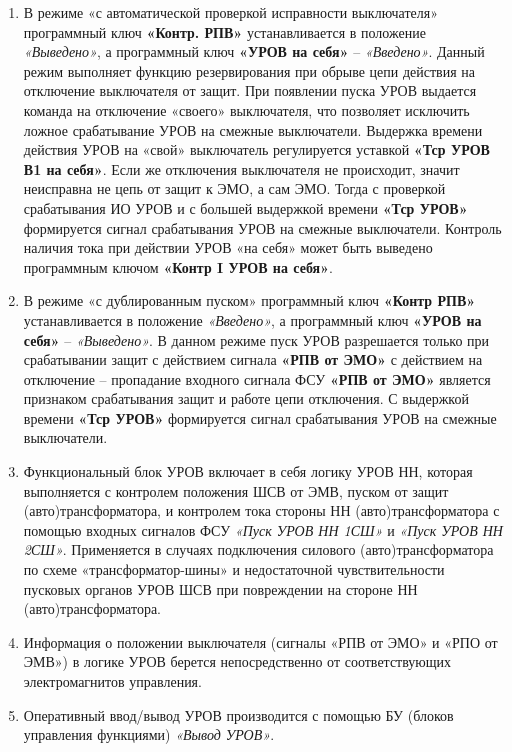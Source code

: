 \begin{enumerate}[label=\arabic{section}.\arabic{subsection}.\arabic*,  align=left, labelsep=4pt, leftmargin=0pt, itemindent=57pt]
\item
В режиме «с автоматической проверкой исправности выключателя» программный ключ
\textbf{«Контр. РПВ»} устанавливается в положение \textit{«Выведено»}, а программный ключ \textbf{«УРОВ на себя»} -- \textit{«Введено»}.
Данный режим выполняет функцию резервирования при обрыве цепи действия на отключение выключателя
от защит. При появлении пуска УРОВ выдается команда на отключение «своего» выключателя, что позволяет
исключить ложное срабатывание УРОВ на смежные выключатели. Выдержка времени действия УРОВ на
«свой» выключатель регулируется уставкой \textbf{«Тср УРОВ В1 на себя»}. Если же отключения выключателя не
происходит, значит неисправна не цепь от защит к ЭМО, а сам ЭМО. Тогда с проверкой срабатывания ИО
УРОВ и с большей выдержкой времени \textbf{«Тср УРОВ»} формируется сигнал срабатывания УРОВ на смежные
выключатели. Контроль наличия тока при действии УРОВ «на себя» может быть выведено программным
ключом \textbf{«Контр I УРОВ на себя»}.

\item
В режиме «с дублированным пуском» программный ключ \textbf{«Контр РПВ»} устанавливается в положение
\textit{«Введено»}, а программный ключ \textbf{«УРОВ на себя»} – \textit{«Выведено»}. В данном режиме пуск УРОВ разрешается
только при срабатывании защит с действием сигнала \textbf{«РПВ от ЭМО»} с действием на отключение --
пропадание входного сигнала ФСУ \textbf{«РПВ от ЭМО»} является признаком срабатывания защит и работе цепи
отключения. С выдержкой времени \textbf{«Тср УРОВ»} формируется сигнал срабатывания УРОВ на смежные
выключатели.

\item
Функциональный блок УРОВ включает в себя логику УРОВ НН, которая выполняется с контролем
положения ШСВ от ЭМВ, пуском от защит (авто)трансформатора, и контролем тока стороны НН
(авто)трансформатора с помощью входных сигналов ФСУ \textit{«Пуск УРОВ НН 1СШ»} и \textit{«Пуск УРОВ НН 2СШ»}.
Применяется в случаях подключения силового (авто)трансформатора по схеме «трансформатор-шины» и
недостаточной чувствительности пусковых органов УРОВ ШСВ при повреждении на стороне НН
(авто)трансформатора. 

\item
Информация о положении выключателя (сигналы «РПВ от ЭМО» и «РПО от ЭМВ») в логике УРОВ
берется непосредственно от соответствующих электромагнитов управления.

\item
Оперативный ввод/вывод УРОВ производится с помощью БУ (блоков управления функциями) \textit{«Вывод УРОВ»}. 


\end{enumerate}
